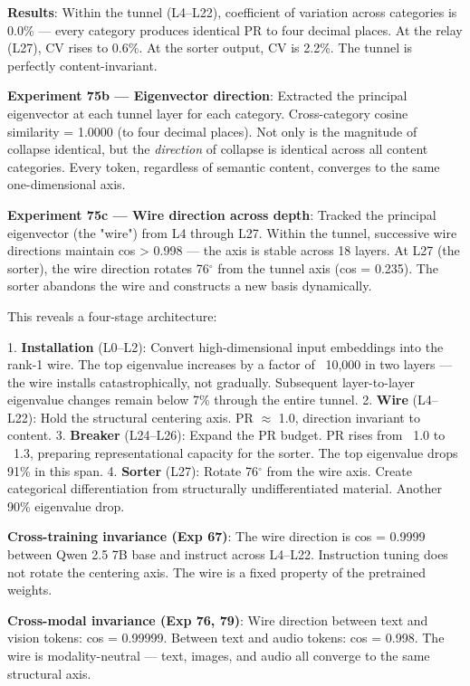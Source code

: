 \documentclass[11pt]{article}
\begin{document}
\textbf{Results}: Within the tunnel (L4–L22), coefficient of variation across categories is 0.0\% --- every category produces identical PR to four decimal places. At the relay (L27), CV rises to 0.6\%. At the sorter output, CV is 2.2\%. The tunnel is perfectly content-invariant.

\textbf{Experiment 75b --- Eigenvector direction}: Extracted the principal eigenvector at each tunnel layer for each category. Cross-category cosine similarity = 1.0000 (to four decimal places). Not only is the magnitude of collapse identical, but the \textit{direction} of collapse is identical across all content categories. Every token, regardless of semantic content, converges to the same one-dimensional axis.

\textbf{Experiment 75c --- Wire direction across depth}: Tracked the principal eigenvector (the "wire") from L4 through L27. Within the tunnel, successive wire directions maintain cos > 0.998 --- the axis is stable across 18 layers. At L27 (the sorter), the wire direction rotates 76$^\circ$ from the tunnel axis (cos = 0.235). The sorter abandons the wire and constructs a new basis dynamically.

This reveals a four-stage architecture:

1. \textbf{Installation} (L0–L2): Convert high-dimensional input embeddings into the rank-1 wire. The top eigenvalue increases by a factor of ~10,000 in two layers --- the wire installs catastrophically, not gradually. Subsequent layer-to-layer eigenvalue changes remain below 7\% through the entire tunnel.
2. \textbf{Wire} (L4–L22): Hold the structural centering axis. PR $\approx$ 1.0, direction invariant to content.
3. \textbf{Breaker} (L24–L26): Expand the PR budget. PR rises from ~1.0 to ~1.3, preparing representational capacity for the sorter. The top eigenvalue drops 91\% in this span.
4. \textbf{Sorter} (L27): Rotate 76$^\circ$ from the wire axis. Create categorical differentiation from structurally undifferentiated material. Another 90\% eigenvalue drop.

\textbf{Cross-training invariance (Exp 67)}: The wire direction is cos = 0.9999 between Qwen 2.5 7B base and instruct across L4–L22. Instruction tuning does not rotate the centering axis. The wire is a fixed property of the pretrained weights.

\textbf{Cross-modal invariance (Exp 76, 79)}: Wire direction between text and vision tokens: cos = 0.99999. Between text and audio tokens: cos = 0.998. The wire is modality-neutral --- text, images, and audio all converge to the same structural axis.
\end{document}
